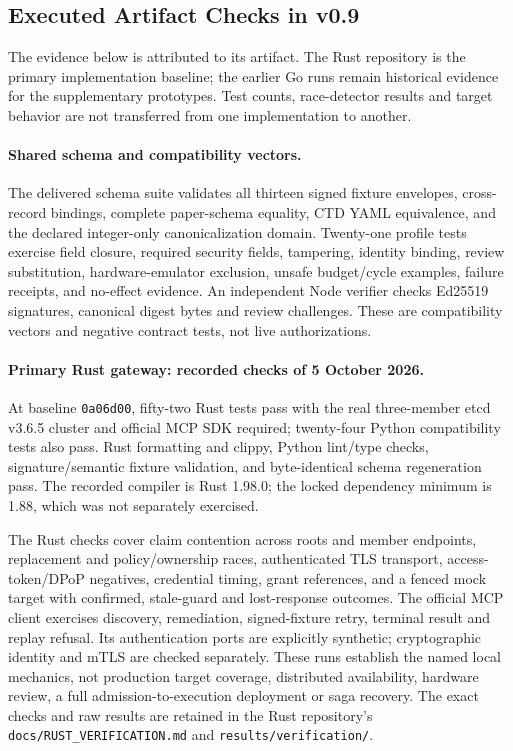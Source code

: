 \subsection{Executed Artifact Checks in v0.9}
\label{sec:executed-checks}
The evidence below is attributed to its artifact. The Rust repository is the primary implementation baseline; the earlier Go runs remain historical evidence for the supplementary prototypes. Test counts, race-detector results and target behavior are not transferred from one implementation to another.

\paragraph{Shared schema and compatibility vectors.}
The delivered schema suite validates all thirteen signed fixture envelopes, cross-record bindings, complete paper-schema equality, CTD YAML equivalence, and the declared integer-only canonicalization domain. Twenty-one profile tests exercise field closure, required security fields, tampering, identity binding, review substitution, hardware-emulator exclusion, unsafe budget/cycle examples, failure receipts, and no-effect evidence. An independent Node verifier checks Ed25519 signatures, canonical digest bytes and review challenges. These are compatibility vectors and negative contract tests, not live authorizations.

\paragraph{Primary Rust gateway: recorded checks of 5 October 2026.}
At baseline \texttt{0a06d00}, fifty-two Rust tests pass with the real three-member etcd v3.6.5 cluster and official MCP SDK required; twenty-four Python compatibility tests also pass. Rust formatting and clippy, Python lint/type checks, signature/semantic fixture validation, and byte-identical schema regeneration pass. The recorded compiler is Rust 1.98.0; the locked dependency minimum is 1.88, which was not separately exercised.

The Rust checks cover claim contention across roots and member endpoints, replacement and policy/ownership races, authenticated TLS transport, access-token/DPoP negatives, credential timing, grant references, and a fenced mock target with confirmed, stale-guard and lost-response outcomes. The official MCP client exercises discovery, remediation, signed-fixture retry, terminal result and replay refusal. Its authentication ports are explicitly synthetic; cryptographic identity and mTLS are checked separately. These runs establish the named local mechanics, not production target coverage, distributed availability, hardware review, a full admission-to-execution deployment or saga recovery. The exact checks and raw results are retained in the Rust repository's \texttt{docs/RUST\_VERIFICATION.md} and \texttt{results/verification/}.

